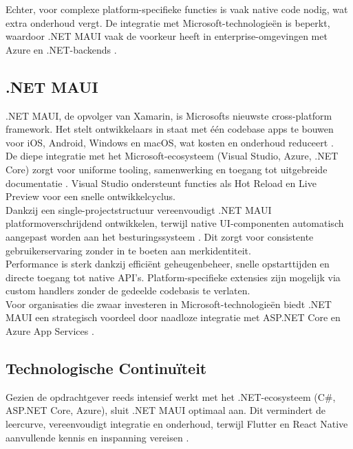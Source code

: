 Echter, voor complexe platform-specifieke functies is vaak native code nodig, wat extra onderhoud vergt. De integratie met Microsoft-technologieën is beperkt, waardoor .NET MAUI vaak de voorkeur heeft in enterprise-omgevingen met Azure en .NET-backends \autocite{Longe2025}.

\subsection{.NET MAUI}
.NET MAUI, de opvolger van Xamarin, is Microsofts nieuwste cross-platform framework. Het stelt ontwikkelaars in staat met één codebase apps te bouwen voor iOS, Android, Windows en macOS, wat kosten en onderhoud reduceert \autocite{Sheth2024}.\\

De diepe integratie met het Microsoft-ecosysteem (Visual Studio, Azure, .NET Core) zorgt voor uniforme tooling, samenwerking en toegang tot uitgebreide documentatie \autocite{Sheth2024}. Visual Studio ondersteunt functies als Hot Reload en Live Preview voor een snelle ontwikkelcyclus.\\

Dankzij een single-projectstructuur vereenvoudigt .NET MAUI platformoverschrijdend ontwikkelen, terwijl native UI-componenten automatisch aangepast worden aan het besturingssysteem \autocite{Sheth2024}. Dit zorgt voor consistente gebruikerservaring zonder in te boeten aan merkidentiteit.\\

Performance is sterk dankzij efficiënt geheugenbeheer, snelle opstarttijden en directe toegang tot native API’s. Platform-specifieke extensies zijn mogelijk via custom handlers zonder de gedeelde codebasis te verlaten.\\

Voor organisaties die zwaar investeren in Microsoft-technologieën biedt .NET MAUI een strategisch voordeel door naadloze integratie met ASP.NET Core en Azure App Services \autocite{Klesman2023}.

\subsection{Technologische Continuïteit}
Gezien de opdrachtgever reeds intensief werkt met het .NET-ecosysteem (C#, ASP.NET Core, Azure), sluit .NET MAUI optimaal aan. Dit vermindert de leercurve, vereenvoudigt integratie en onderhoud, terwijl Flutter en React Native aanvullende kennis en inspanning vereisen \autocite{Longe2025}.

